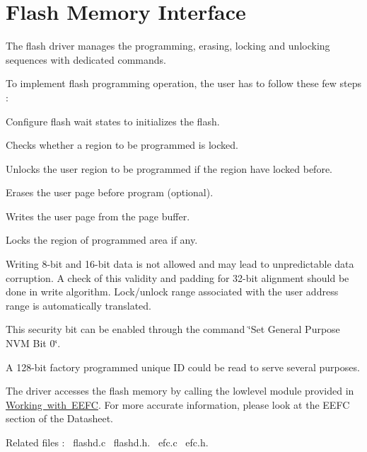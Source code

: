 \hypertarget{group__flashd__module}{}\section{Flash Memory Interface}
\label{group__flashd__module}
The flash driver manages the programming, erasing, locking and unlocking sequences with dedicated commands.

To implement flash programming operation, the user has to follow these few steps \+: 
\begin{DoxyItemize}
\item Configure flash wait states to initializes the flash.  
\item Checks whether a region to be programmed is locked.  
\item Unlocks the user region to be programmed if the region have locked before. 
\item Erases the user page before program (optional). 
\item Writes the user page from the page buffer. 
\item Locks the region of programmed area if any. 
\end{DoxyItemize}

Writing 8-\/bit and 16-\/bit data is not allowed and may lead to unpredictable data corruption. A check of this validity and padding for 32-\/bit alignment should be done in write algorithm. Lock/unlock range associated with the user address range is automatically translated.

This security bit can be enabled through the command \char`\"{}\+Set General Purpose
\+N\+V\+M Bit 0\char`\"{}.

A 128-\/bit factory programmed unique ID could be read to serve several purposes.

The driver accesses the flash memory by calling the lowlevel module provided in \mbox{\hyperlink{group__efc__module}{Working with E\+E\+FC}}. For more accurate information, please look at the E\+E\+FC section of the Datasheet.

Related files \+:~\newline
flashd.\+c~\newline
 flashd.\+h.~\newline
 efc.\+c~\newline
 efc.\+h.~\newline
 